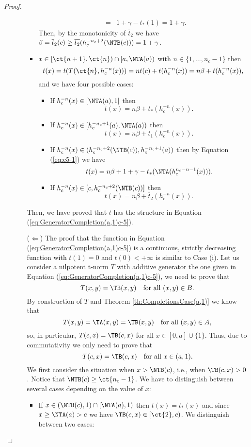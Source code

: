 \begin{proof}
\begin{enumerate}[label=(\roman*)]
\begin{itemize}
\begin{itemize}
\begin{eqnarray*}
					&=& 1 + \gamma -t_*(1)= 1 + \gamma.
				\end{eqnarray*}
				Then, by the monotonicity of $\overline{t}_2$ we have $\beta=\overline{t}_2(c) \geq \overline{t_2}(h_c^{-n_c+2}(\NTB(c))) = 1 + \gamma$.
				\item $x \in [\ct{n+1},\ct{n}) \cap [a,\NTA(a))$ with $n \in \{1,\dots, n_c-1\}$ then
				$$t(x) = t(T(\ct{n},h_c^{-n}(x))) = nt(c)+t(h_c^{-n}(x)) = n\beta+t(h_c^{-n}(x)),$$
				and we have four possible cases:
				\begin{itemize}
					\item If $h_c^{-n}(x) \in [\NTA(a),1]$ then
					$$t(x) = n\beta+t_*(h_c^{-n}(x)).$$
					\item If $h_c^{-n}(x) \in [h_c^{-n_c+1}(a),\NTA(a))$ then
					$$t(x) = n\beta+\overline{t}_1(h_c^{-n}(x)).$$
					\item If $h_c^{-n}(x) \in (h_c^{-n_c+2}(\NTB(c)),h_c^{-n_c+1}(a))$ then by Equation (\ref{eq:c5-1}) we have
					$$t(x) = n\beta+1+ \gamma - t_*(\NTA(h_c^{n_c-n-1}(x))).$$
					\item If $h_c^{-n}(x) \in [c,h_c^{-n_c+2}(\NTB(c))]$ then
					$$t(x) = n\beta+\overline{t}_2(h_c^{-n}(x)).$$
				\end{itemize}
			\end{itemize}
			Then, we have proved that $t$ has the structure in Equation (\ref{eq:GeneratorCompletion(a,1)c-5}).
			\item[($\Leftarrow$)] The proof that the function in Equation (\ref{eq:GeneratorCompletion(a,1)c-5}) is a continuous, strictly decreasing function with $t(1)=0$ and $t(0)<+\infty$ is similar to Case (i). Let us consider a nilpotent t-norm $T$ with additive generator the one given in Equation (\ref{eq:GeneratorCompletion(a,1)c-5}), we need to prove that
			$$T(x,y)=\TB(x,y) \quad \text{for all } (x,y) \in B.$$
			By construction of $T$ and Theorem \ref{th:CompletionsCase(a,1)} we know that
			$$T(x,y)= \TA(x,y)=\TB(x,y) \quad \text{for all } (x,y) \in A,$$
			so, in particular, $T(c,x)=\TB(c,x)$ for all $x \in [0,a] \cup \{1\}$. Thus, due to commutativity we only need to prove that
			$$T(c,x)=\TB(c,x) \quad \text{for all } x \in (a,1).$$
			We first consider the situation when $x > \NTB(c)$, i.e., when $\TB(c,x)>0$. Notice that $\NTB(c) \geq \ct{n_c-1}$. We have to distinguish between several cases depending on the value of $x$:
			\begin{itemize}
				\item If $x \in  (\NTB(c),1) \cap [\NTA(a),1)$ then $t(x)=t_*(x)$ and  since $x \geq \NTA(a)>c$ we have $\TB(c,x) \in [\ct{2},c)$. We distinguish between two cases:

\end{itemize}
\end{itemize}
\end{enumerate}
\end{proof}

